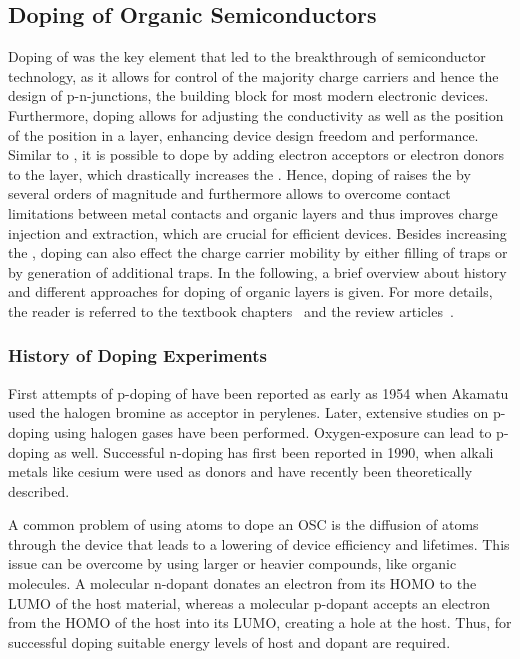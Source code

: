 \subsection{Doping of Organic Semiconductors}\label{sec:TheoDopingOrg}
Doping of \CSCs was the key element that led to the breakthrough of semiconductor technology, as it allows for control of the majority charge carriers and hence the design of p-n-junctions, the building block for most modern electronic devices. Furthermore, doping allows for adjusting the conductivity as well as the position of the \EfLong position in a layer, enhancing device design freedom and performance.
Similar to \CSCs, it is possible to dope \OSCs by adding electron acceptors or electron donors to the layer, which drastically increases the \nLong.
Hence, doping of \OSCs raises the \cLong by several orders of magnitude and furthermore allows to overcome contact limitations between metal contacts and organic layers and thus improves charge injection and extraction, which are crucial for efficient devices. Besides increasing the \nLong, doping can also effect the charge carrier mobility by either filling of traps or by generation of additional traps\cite{Schmechel2004,Arkhipov2005}.
In the following, a brief overview about history and different approaches for doping of organic layers is given. For more details, the reader is referred to the textbook chapters~\cite{RiedeLuessemLeo2011,LuessemRiedeLeo2012,HummertLeo2013} and the review articles~\cite{Walzer2007,LuessemRiedeLeo2013-PSS}.

\subsubsection{History of Doping Experiments}
First attempts of p-doping of \OSCs have been reported as early as 1954 when Akamatu\etal\cite{Akamatu1954} used the halogen bromine as acceptor in perylenes. Later, extensive studies on p-doping using halogen gases have been performed\cite{Curry1962,Yamamoto1979}.
Oxygen-exposure can lead to p-doping as well\cite{Vaterlein1996,Hamed1993}.
Successful n-doping has first been reported\cite{Ramsey1990,Haddon1991} in 1990, when alkali metals like cesium %
were used as donors and have recently been theoretically described\cite{Mityashin2012}.

A common problem of using atoms to dope an OSC is the diffusion of atoms through the device that leads to a lowering of device efficiency and lifetimes\cite{Walzer2007}. This issue can be overcome by using larger or heavier compounds, like organic molecules. A molecular n-dopant donates an electron from its HOMO to the LUMO of the host material, whereas a molecular p-dopant accepts an electron from the HOMO of the host into its LUMO, creating a hole at the host. Thus, for successful doping suitable energy levels of host and dopant are required.

